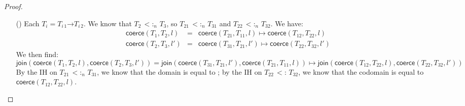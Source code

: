 \documentclass[9pt]{extarticle}
\newcommand{\ottnt}[1]{\mathit{#1}}
\newcommand{\ottmv}[1]{\mathit{#1}}
\newcommand{\ottsym}[1]{#1}
\begin{document}
{\begin{lemma}
\begin{proof}
\begin{itemize}
    \item[(\Sub{Fun})] Each $\ottnt{T_{\ottmv{i}}}  \ottsym{=}   \ottnt{T_{\ottmv{i}\,{\mathrm{1}}}} \mathord{ \rightarrow } \ottnt{T_{\ottmv{i}\,{\mathrm{2}}}} $. We know that $\ottnt{T_{{\mathrm{2}}}} \,  <: _{ \ottmv{n} }  \, \ottnt{T_{{\mathrm{3}}}}$, so $\ottnt{T_{{\mathrm{21}}}} \,  <: _{ \ottmv{n} }  \, \ottnt{T_{{\mathrm{31}}}}$ and $\ottnt{T_{{\mathrm{22}}}} \,  <: _{ \ottmv{n} }  \, \ottnt{T_{{\mathrm{32}}}}$. We have:
\[ \begin{array}{rcl}
         \mathsf{coerce} ( \ottnt{T_{{\mathrm{1}}}} , \ottnt{T_{{\mathrm{2}}}} , \ottnt{l} )  &=&  \mathsf{coerce} ( \ottnt{T_{{\mathrm{21}}}} , \ottnt{T_{{\mathrm{11}}}} , \ottnt{l} )   \mapsto   \mathsf{coerce} ( \ottnt{T_{{\mathrm{12}}}} , \ottnt{T_{{\mathrm{22}}}} , \ottnt{l} )  \\
         \mathsf{coerce} ( \ottnt{T_{{\mathrm{2}}}} , \ottnt{T_{{\mathrm{3}}}} , \ottnt{l'} )  &=&  \mathsf{coerce} ( \ottnt{T_{{\mathrm{31}}}} , \ottnt{T_{{\mathrm{21}}}} , \ottnt{l'} )   \mapsto   \mathsf{coerce} ( \ottnt{T_{{\mathrm{22}}}} , \ottnt{T_{{\mathrm{32}}}} , \ottnt{l'} ) 
      \end{array} \]
We then find:
\[  \mathsf{join} (  \mathsf{coerce} ( \ottnt{T_{{\mathrm{1}}}} , \ottnt{T_{{\mathrm{2}}}} , \ottnt{l} )  ,  \mathsf{coerce} ( \ottnt{T_{{\mathrm{2}}}} , \ottnt{T_{{\mathrm{3}}}} , \ottnt{l'} )  )   \ottsym{=}   \mathsf{join} (  \mathsf{coerce} ( \ottnt{T_{{\mathrm{31}}}} , \ottnt{T_{{\mathrm{21}}}} , \ottnt{l'} )  ,  \mathsf{coerce} ( \ottnt{T_{{\mathrm{21}}}} , \ottnt{T_{{\mathrm{11}}}} , \ottnt{l} )  )   \mapsto   \mathsf{join} (  \mathsf{coerce} ( \ottnt{T_{{\mathrm{12}}}} , \ottnt{T_{{\mathrm{22}}}} , \ottnt{l} )  ,  \mathsf{coerce} ( \ottnt{T_{{\mathrm{22}}}} , \ottnt{T_{{\mathrm{32}}}} , \ottnt{l'} )  )  
      \]
By the IH on $\ottnt{T_{{\mathrm{21}}}} \,  <: _{ \ottmv{n} }  \, \ottnt{T_{{\mathrm{31}}}}$, we know that the domain is equal
      to ; by
      the IH on $\ottnt{T_{{\mathrm{22}}}} \, <: \, \ottnt{T_{{\mathrm{32}}}}$, we know that the codomain is equal
      to $ \mathsf{coerce} ( \ottnt{T_{{\mathrm{12}}}} , \ottnt{T_{{\mathrm{22}}}} , \ottnt{l} ) $.

    \end{itemize}
  \end{proof}
\end{lemma}
\fi}
\end{document}
